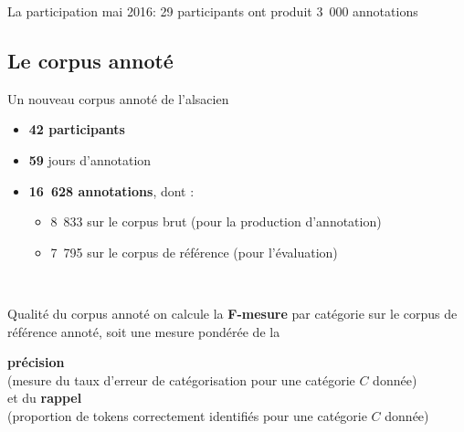 \documentclass[french]{beamer}
\newcommand{\tool}[1]{\texttt{#1}\xspace}
\newcommand\Wider[2][3em]{%
  \makebox[\linewidth][c]{%
    \begin{minipage}{\dimexpr\textwidth+#1\relax}
      \raggedright#2
    \end{minipage}%
  }%
}
\begin{document}
\begin{frame}{La participation}
  \bigskip
      \small mai 2016:  \small 29 participants ont produit 3~000 annotations \\
      \bigskip
\end{frame}

\subsection{Le corpus annoté}
\begin{frame}{Un nouveau corpus annoté de l'alsacien}
    \begin{itemize}
    \item \textbf{42 participants}
    \item \textbf{59} jours d'annotation
    \item \textbf{16~628 annotations}, dont :
      \begin{itemize}
        \item 8~833 sur le corpus brut (pour la production d'annotation)
        \item<2-> 7~795 sur le corpus de référence (pour l'évaluation)
      \end{itemize}
      \end{itemize}
    \\
\end{frame}


\begin{frame}{Qualité du corpus annoté}
  \centering
  on calcule la \textbf{F-mesure} par catégorie sur le corpus de référence annoté, soit une mesure pondérée de la

  \textbf{précision} \\ \footnotesize (mesure du taux d'erreur de catégorisation pour une catégorie $C$ donnée) \\ \normalsize et du \textbf{rappel} \\ \footnotesize (proportion de tokens correctement identifiés pour une catégorie $C$ donnée)
\end{frame}
\end{document}
